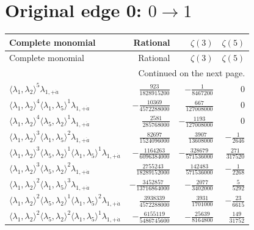 \section{Original edge 0: $0\to 1$}
\begin{longtable}{@{}lrrr@{}}
\toprule
Complete monomial & Rational & $\zeta(3)$ & $\zeta(5)$ \\
\midrule\endfirsthead
\toprule Complete monomial & Rational & $\zeta(3)$ & $\zeta(5)$ \\
\midrule\endhead
\midrule\multicolumn{4}{r}{Continued on the next page.}\\\endfoot
\bottomrule\endlastfoot
$\langle\lambda_1,\lambda_2\rangle^{5}\lambda_{1,+\dot a}$ & $\frac{923}{1828915200}$ & $-\frac{1}{8467200}$ & $0$ \\
$\langle\lambda_1,\lambda_2\rangle^{4}\langle\lambda_1,\lambda_5\rangle^{1}\lambda_{1,+\dot a}$ & $-\frac{10369}{4572288000}$ & $\frac{667}{127008000}$ & $0$ \\
$\langle\lambda_1,\lambda_2\rangle^{4}\langle\lambda_5,\lambda_2\rangle^{1}\lambda_{1,+\dot a}$ & $\frac{2581}{285768000}$ & $-\frac{1193}{127008000}$ & $0$ \\
$\langle\lambda_1,\lambda_2\rangle^{3}\langle\lambda_1,\lambda_5\rangle^{2}\lambda_{1,+\dot a}$ & $\frac{82697}{1524096000}$ & $\frac{3907}{13608000}$ & $-\frac{1}{2646}$ \\
$\langle\lambda_1,\lambda_2\rangle^{3}\langle\lambda_5,\lambda_2\rangle^{1}\langle\lambda_1,\lambda_5\rangle^{1}\lambda_{1,+\dot a}$ & $-\frac{1164263}{6096384000}$ & $-\frac{328679}{571536000}$ & $\frac{271}{317520}$ \\
$\langle\lambda_1,\lambda_2\rangle^{3}\langle\lambda_5,\lambda_2\rangle^{2}\lambda_{1,+\dot a}$ & $\frac{2755243}{18289152000}$ & $\frac{142483}{571536000}$ & $-\frac{1}{2268}$ \\
$\langle\lambda_1,\lambda_2\rangle^{2}\langle\lambda_1,\lambda_5\rangle^{3}\lambda_{1,+\dot a}$ & $-\frac{3452857}{13716864000}$ & $-\frac{2077}{3402000}$ & $\frac{5}{5292}$ \\
$\langle\lambda_1,\lambda_2\rangle^{2}\langle\lambda_5,\lambda_2\rangle^{1}\langle\lambda_1,\lambda_5\rangle^{2}\lambda_{1,+\dot a}$ & $\frac{3938339}{4572288000}$ & $\frac{3931}{1701000}$ & $-\frac{23}{6615}$ \\
$\langle\lambda_1,\lambda_2\rangle^{2}\langle\lambda_5,\lambda_2\rangle^{2}\langle\lambda_1,\lambda_5\rangle^{1}\lambda_{1,+\dot a}$ & $-\frac{6155119}{5486745600}$ & $-\frac{25639}{8164800}$ & $\frac{149}{31752}$ \\

\end{longtable}
